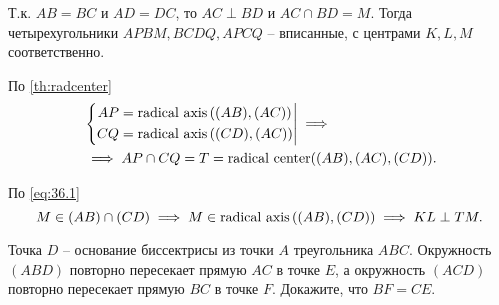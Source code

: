 \begin{tasks}
{            Т.к. $AB = BC$ и $AD=DC$, то $AC \perp BD$ и $AC \cap BD = M$.
            Тогда четырехугольники $APBM, BCDQ, APCQ$ -- вписанные, с центрами $K, L, M$ соответственно.

            По \cref{th:radcenter}
            \begin{equation}\label{eq:36.1}
                \begin{aligned}
                    &\left\{\begin{aligned}
                            AP &= \operatorname{\text{radical axis}}\left((AB), (AC)\right) \\
                            CQ &= \operatorname{\text{radical axis}}\left( (CD), (AC) \right) 
                        \end{aligned}\right| \implies \\
                    &\implies AP \cap CQ = T = \operatorname{\text{radical center}}((AB), (AC), (CD)).
                \end{aligned}
            \end{equation} 

            По \cref{eq:36.1} 
            \begin{equation}
                M \in (AB) \cap (CD) \implies M \in \operatorname{\text{radical axis}}\left( (AB), (CD) \right) \implies KL \perp TM.
            \end{equation} 
        }
    \item Точка $D$ -- основание биссектрисы из точки $A$ треугольника $ABC$. Окружность $(ABD)$ повторно пересекает прямую $AC$ в точке $E$, а окружность $(ACD)$ повторно пересекает прямую $BC$ в точке $F$. Докажите, что $BF = CE$. 

\end{tasks}

